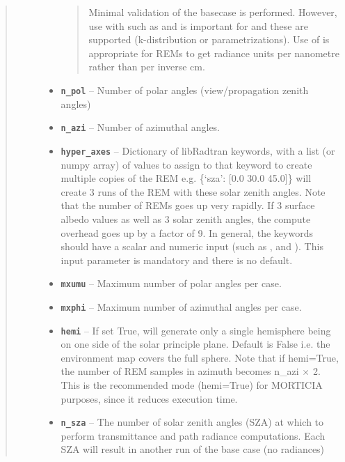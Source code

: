 \documentclass[a4paper,10pt,english]{sphinxmanual}
\begin{document}
\begin{fulllineitems}
\begin{quote}
\begin{description}
\begin{itemize}
\begin{quote}
Minimal validation of the basecase is performed. However, use with  such as  and
 is important for  and these are supported (k-distribution or 
parametrizations). Use of  is appropriate for  REMs to get
radiance units per nanometre rather than per inverse cm.
\end{quote}


\item {} 
\textbf{\texttt{n\_pol}} -- Number of polar angles (view/propagation zenith angles)

\item {} 
\textbf{\texttt{n\_azi}} -- Number of azimuthal angles.

\item {} 
\textbf{\texttt{hyper\_axes}} -- Dictionary of libRadtran keywords, with a list (or numpy array) of values to assign  to
that keyword to create multiple copies of the REM e.g. \{`sza': {[}0.0 30.0 45.0{]}\} will create 3 runs of the
REM with these solar zenith angles. Note that the number of REMs goes up very rapidly. If 3 surface
albedo values as well as 3 solar zenith angles, the compute overhead goes up by a factor of 9.
In general, the keywords should have a scalar and numeric input (such as ,  and
). This input parameter is mandatory and there is no default.

\item {} 
\textbf{\texttt{mxumu}} -- Maximum number of polar angles per case.

\item {} 
\textbf{\texttt{mxphi}} -- Maximum number of azimuthal angles per case.

\item {} 
\textbf{\texttt{hemi}} -- If set True, will generate only a single hemisphere being on one side of
the solar principle plane. Default is False i.e. the environment map covers the full sphere.
Note that if hemi=True, the number of REM samples in azimuth becomes n\_azi \(\times\) 2.
This is the recommended mode (hemi=True) for MORTICIA purposes, since it reduces execution time.

\item {} 
\textbf{\texttt{n\_sza}} -- The number of solar zenith angles (SZA) at which to perform transmittance and path radiance
computations. Each SZA will result in another run of the base case (no radiances)


\end{itemize}
\end{description}
\end{quote}
\end{fulllineitems}
\end{document}
